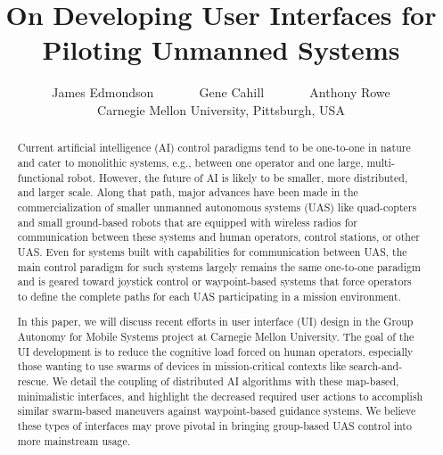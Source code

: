 \documentclass{sig-alternate-ipsn13}
\begin{document}
\title{On Developing User Interfaces for Piloting Unmanned Systems}
\author{James Edmondson ~~~~~~ Gene Cahill ~~~~~~ Anthony Rowe\\
Carnegie Mellon University, Pittsburgh, USA \\
}
\maketitle

\begin{abstract}
Current artificial intelligence (AI) control paradigms tend to be one-to-one in
nature and cater to
monolithic systems, e.g., between one operator and one large, multi-functional
robot. However, the future of AI is likely to be smaller, more distributed, and
larger scale. Along that path, major advances have been made in the
commercialization of smaller unmanned autonomous systems (UAS) like
quad-copters and small ground-based robots that are equipped with wireless
radios for communication between these systems and human operators, control
stations, or other UAS. Even for systems built with capabilities for
communication between UAS, the main control paradigm for such systems largely
remains the same one-to-one paradigm and is geared toward joystick control or
waypoint-based systems that force operators to define the complete paths for
each UAS participating in a mission environment.

In this paper, we will discuss recent efforts in user interface (UI) design in
the Group Autonomy for Mobile Systems project at Carnegie Mellon University.
The goal of the UI development is to reduce the cognitive load forced on human
operators, especially those wanting to use swarms of devices in mission-critical
contexts like search-and-rescue.  We detail the coupling of distributed AI
algorithms with these map-based, minimalistic interfaces, and highlight the
decreased required user actions to accomplish similar swarm-based maneuvers
against waypoint-based guidance systems. We believe these types of interfaces
may prove pivotal in bringing group-based UAS control into more mainstream usage.

\end{abstract}

\end{document}
